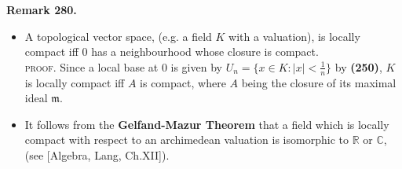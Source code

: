 \documentclass[12pt,a4paper,footinclude=true,headinclude=true]{scrbook} %
\newenvironment{remark}[2][Remark]
    { \begin{mdframed}[backgroundcolor=gray!20] \textbf{#1 #2.} }
    {  \end{mdframed}}
\begin{document}
\begin{remark}{280}
    \begin{itemize}
        \item[(a)] A topological vector space, (e.g. a field $K$ with a valuation), is locally compact iff $0$ has a neighbourhood whose closure is compact.\\
        \textsc{proof.} Since a local base at $0$ is given by $U_n=\{x\in K:|x|<\frac{1}{n}\}$ by \textbf{(250)}, $K$ is locally compact iff $A$ is compact, where $A$ being the closure of its maximal ideal $\mathfrak{m}$.
        \item[(b)] It follows from the \textbf{Gelfand-Mazur Theorem} that a field which is locally compact with respect to an archimedean valuation is isomorphic to $\mathbb{R}$ or $\mathbb{C}$, (see [Algebra, Lang, Ch.XII]).
    \end{itemize}
\end{remark}
\end{document}
